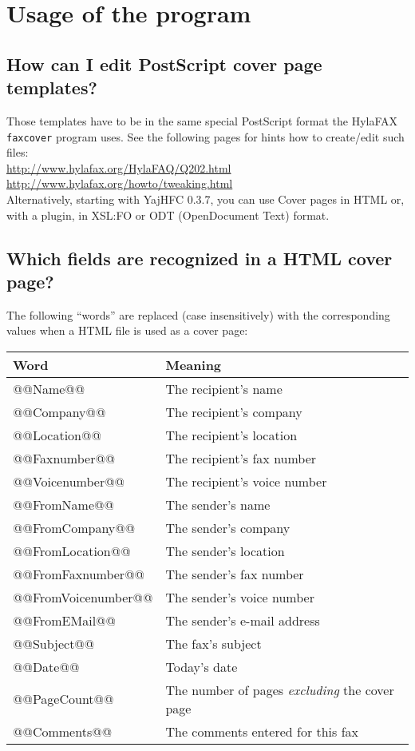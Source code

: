\documentclass[a4paper,10pt]{scrartcl}
\begin{document}
\section{Usage of the program}	

\subsection{How can I edit PostScript cover page templates?}
Those templates have to be in the same special PostScript format the HylaFAX
\texttt{faxcover} program uses. See the following pages for hints how to create/edit
such files: \\
\url{http://www.hylafax.org/HylaFAQ/Q202.html}\\
\url{http://www.hylafax.org/howto/tweaking.html}\\

Alternatively, starting with YajHFC 0.3.7, you can use Cover pages in HTML or, with a plugin, in XSL:FO or ODT (OpenDocument Text) format.

\subsection{Which fields are recognized in a HTML cover page?}

The following ``words'' are replaced (case insensitively) with the corresponding values when a HTML file is used as a cover page:

\begin{center}
\begin{tabular}{|l|l|}
\hline
\bfseries Word & \bfseries Meaning \\
\hline\hline
\ttfamily @@Name@@ & The recipient's name \\\hline
\ttfamily @@Company@@ & The recipient's company \\\hline
\ttfamily @@Location@@ & The recipient's location \\\hline
\ttfamily @@Faxnumber@@ & The recipient's fax number \\\hline
\ttfamily @@Voicenumber@@ & The recipient's voice number \\\hline
\ttfamily @@FromName@@ & The sender's name \\\hline
\ttfamily @@FromCompany@@ & The sender's company \\\hline
\ttfamily @@FromLocation@@ & The sender's location \\\hline
\ttfamily @@FromFaxnumber@@ & The sender's fax number \\\hline
\ttfamily @@FromVoicenumber@@ & The sender's voice number \\\hline
\ttfamily @@FromEMail@@ & The sender's e-mail address \\\hline
\ttfamily @@Subject@@ & The fax's subject \\\hline
\ttfamily @@Date@@ & Today's date \\\hline
\ttfamily @@PageCount@@ & The number of pages \textit{excluding} the cover page \\\hline
\ttfamily @@Comments@@ & The comments entered for this fax \\\hline
\end{tabular}
\end{center}
\end{document}
